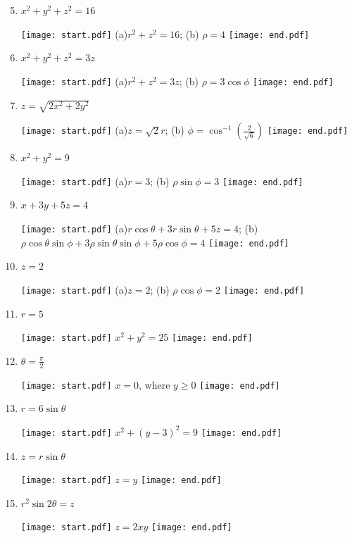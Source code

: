 \documentclass[12pt]{article}
\begin{document}
\begin{enumerate}
\setcounter{enumi}{4}

\item $x^2+y^2+z^2=16$

\texttt{[image: start.pdf]}
{{(a)$r^2+z^2=16$; (b) $\rho=4$}}
\texttt{[image: end.pdf]}


\item $x^2+y^2+z^2=3z$

\texttt{[image: start.pdf]}
{{(a)$r^2+z^2=3z$; (b) $\rho=3\cos{\phi}$}}
\texttt{[image: end.pdf]}


\item $z=\sqrt{2x^2+2y^2}$

\texttt{[image: start.pdf]}
{{(a)$z=\sqrt{2}r$; (b) $\phi=\cos^{-1}\left(\frac{2}{\sqrt{6}}\right)$}}
\texttt{[image: end.pdf]}


\item $x^2+y^2=9$

\texttt{[image: start.pdf]}
{{(a)$r=3$; (b) $\rho\sin{\phi}=3$}}
\texttt{[image: end.pdf]}


\item $x+3y+5z=4$

\texttt{[image: start.pdf]}
{{(a)$r\cos{\theta}+3r\sin{\theta}+5z=4$; (b) $\rho\cos{\theta}\sin{\phi}+3\rho\sin{\theta}\sin{\phi}+5\rho\cos{\phi}=4$}}
\texttt{[image: end.pdf]}


\item $z=2$

\texttt{[image: start.pdf]}
{{(a)$z=2$; (b) $\rho\cos{\phi}=2$}}
\texttt{[image: end.pdf]}


\end{enumerate}


\begin{enumerate}
\setcounter{enumi}{10}

\item $r=5$

\texttt{[image: start.pdf]}
{{$x^2+y^2=25$}}
\texttt{[image: end.pdf]}


\item $\theta=\frac{\pi}{2}$

\texttt{[image: start.pdf]}
{{$x=0$, where $y \geq 0$}}
\texttt{[image: end.pdf]}


\item $r=6\sin{\theta}$

\texttt{[image: start.pdf]}
{{$x^2+(y-3)^2=9$}}
\texttt{[image: end.pdf]}


\item $z=r\sin{\theta}$

\texttt{[image: start.pdf]}
{{$z=y$}}
\texttt{[image: end.pdf]}


\item $r^2\sin{2\theta}=z$

\texttt{[image: start.pdf]}
{{$z=2xy$}}
\texttt{[image: end.pdf]}


\end{enumerate}
\end{document}
